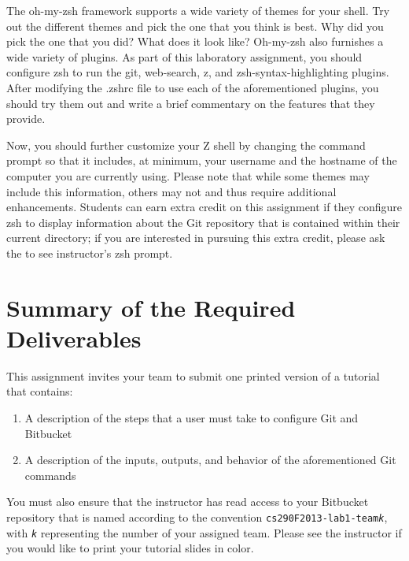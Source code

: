 The oh-my-zsh framework supports a wide variety of themes for your shell.  Try out the different themes and pick the one that you
think is best.  Why did you pick the one that you did? What does it look like? Oh-my-zsh also furnishes a wide variety of plugins.
As part of this laboratory assignment, you should configure zsh to run the git, web-search, z, and zsh-syntax-highlighting
plugins.  After modifying the .zshrc file to use each of the aforementioned plugins, you should try them out and write a brief
commentary on the features that they provide.

Now, you should further customize your Z shell by changing the command prompt so that it includes, at minimum, your username and
the hostname of the computer you are currently using.  Please note that while some themes may include this information, others may
not and thus require additional enhancements.  Students can earn extra credit on this assignment if they configure zsh to display
information about the Git repository that is contained within their current directory; if you are interested in pursuing this
extra credit, please ask the to see instructor's zsh prompt.


\section*{Summary of the Required Deliverables}

This assignment invites your team to submit one printed version of a tutorial that contains:

\begin{enumerate}
	
	\item A description of the steps that a user must take to configure Git and Bitbucket

	\item A description of the inputs, outputs, and behavior of the aforementioned Git commands

\end{enumerate}

You must also ensure that the instructor has read access to your Bitbucket repository that is named according to the
convention {\tt cs290F2013-lab1-team{\em k}}, with {\tt {\em k}} representing the number of your assigned team. Please
see the instructor if you would like to print your tutorial slides in color.



